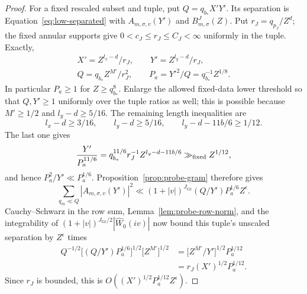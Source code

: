 \begin{proposition}
\begin{proof}
For a fixed rescaled subset and tuple, put $Q=q_{b_*}X'Y'$.
Its separation is Equation~\eqref{eq:low-separated} with
$A_{m,\sigma,v}(Y')$ and $B^J_{m,\sigma}(Z)$.  Put
$r_J=q_{p_J}/Z^d$; the fixed annular supports give
$0<c_J\le r_J\le C_J<\infty$ uniformly in the tuple.  Exactly,
\[
 \begin{gathered}
 X'=Z^{l_x-d}/r_J,\qquad Y'=Z^{l_y-d}/r_J,\\
 Q=q_{b_*}Z^{M'}/r_J^2,\qquad
 P_a=Y'^2/Q=q_{b_*}^{-1}Z^{1/8}.
 \end{gathered}
\]
In particular $P_a\ge1$ for $Z\ge q_{b_*}^8$.  Enlarge the allowed
fixed-data lower threshold so that $Q,Y'\ge1$ uniformly over the
tuple ratios as well; this is possible because $M'\ge1/2$ and
$l_y-d\ge5/16$.  The remaining length inequalities are
\[
 l_x-d\ge3/16,\qquad l_y-d\ge5/16,
 \qquad l_y-d-11b/6\ge1/12.
\]
The last one gives
\[
 \frac{Y'}{P_a^{11/6}}
 =q_{b_*}^{11/6}r_J^{-1}Z^{l_y-d-11b/6}
       \gg_{\rm fixed}Z^{1/12},
\]
and hence $P_a^2/Y'\ll P_a^{1/6}$.  Proposition~\ref{prop:probe-gram}
therefore gives
\begin{equation}
 \sum_{q_m\ll Q}|A_{m,\sigma,v}(Y')|^2
 \ll (1+|v|)^{J_{\mathrm{Gr}}}(Q/Y')P_a^{1/6}Z^\epsilon.
 \label{old-eq:5.6}
\end{equation}
Cauchy--Schwarz in the row sum, Lemma~\ref{lem:probe-row-norm},
and the integrability of $(1+|v|)^{J_{\mathrm{Gr}}/2}|\widehat W_0(iv)|$ now
bound this tuple's unscaled separation by $Z^\epsilon$ times
\[
 \begin{aligned}
 Q^{-1/2}\bigl[(Q/Y')P_a^{1/6}\bigr]^{1/2}
       \bigl[Z^{M'}\bigr]^{1/2}
 &=\bigl[Z^{M'}/Y'\bigr]^{1/2}P_a^{1/12}\\
 &=r_J(X')^{1/2}P_a^{1/12}.
 \end{aligned}
\]
Since $r_J$ is bounded, this is
$O((X')^{1/2}P_a^{1/12}Z^\epsilon)$.


\end{proof}
\end{proposition}
